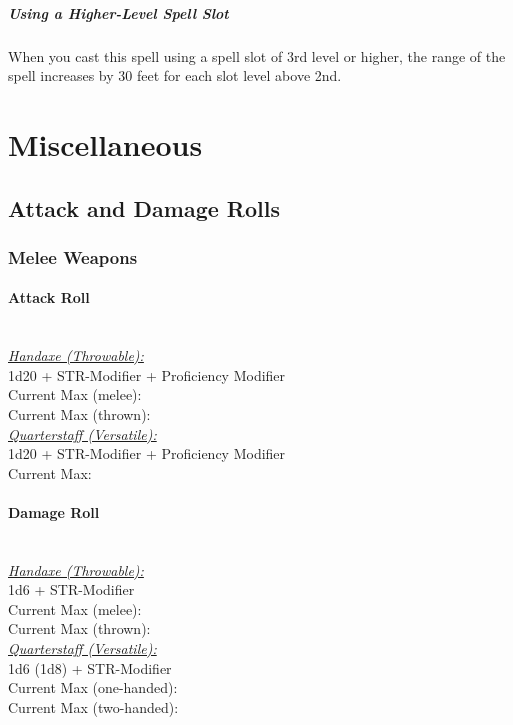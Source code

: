 \documentclass[letterpaper,openany,oneside,twocolumn]{book}
\begin{document}
\subparagraph*{Using a Higher-Level Spell Slot} When you cast this spell using a spell slot of 3rd level or higher, the range of the spell increases by 30 feet for each slot level above 2nd.

\vfill\eject
\section*{Miscellaneous}
\subsection*{Attack and Damage Rolls}
\subsubsection*{Melee Weapons}
\paragraph*{Attack Roll}\hfill\\
\underline{\textit{Handaxe (Throwable):}}\\
1d20 + STR-Modifier + Proficiency Modifier\\
\indent Current Max (melee): \\
\indent Current Max (thrown): 
\\
\underline{\textit{Quarterstaff (Versatile):}}\\
1d20 + STR-Modifier + Proficiency Modifier\\
\indent Current Max: 
\paragraph*{Damage Roll}\hfill\\
\underline{\textit{Handaxe (Throwable):}}\\
1d6 + STR-Modifier\\
\indent Current Max (melee): \\
\indent Current Max (thrown): 
\\
\underline{\textit{Quarterstaff (Versatile):}}\\
1d6 (1d8) + STR-Modifier\\
\indent Current Max (one-handed): \\
\indent Current Max (two-handed): 
\end{document}

